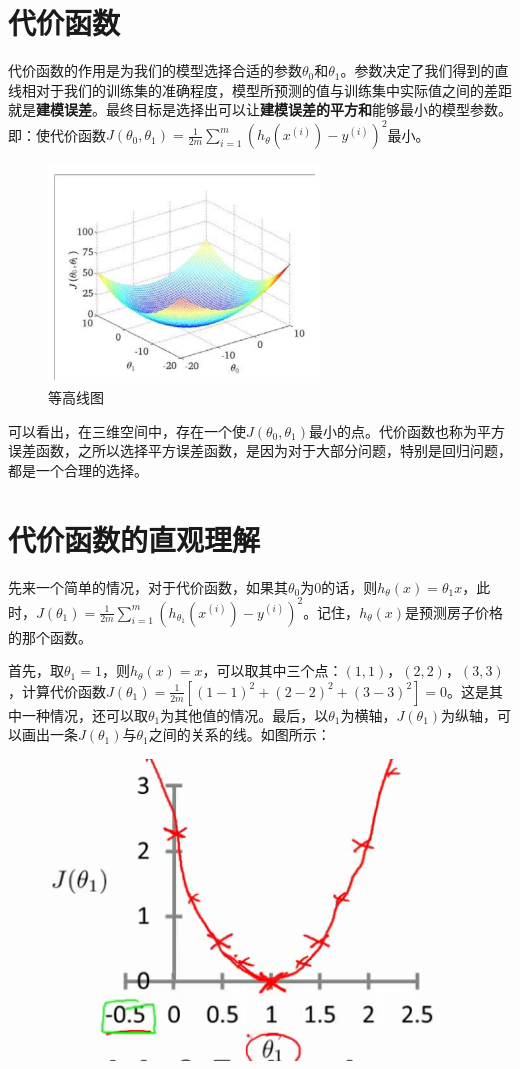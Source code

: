 \documentclass{article}
\begin{document}
\begin{large}
  \section{代价函数}
  代价函数的作用是为我们的模型选择合适的参数$\theta_0$和$\theta_1$。参数决定了我们得到的直线相对于我们的训练集的准确程度，模型所预测的值与训练集中实际值之间的差距就是\textbf{建模误差}。最终目标是选择出可以让\textbf{建模误差的平方和}能够最小的模型参数。即：使代价函数$J(\theta_0, \theta_1)=\frac{1}{2m}\sum_{i=1}^{m}(h_\theta(x^{(i)})-y^{(i)})^2$最小。

  \begin{figure}[h]
    \centering
    \includegraphics{1.PNG}
    \caption{等高线图}
  \end{figure}
  可以看出，在三维空间中，存在一个使$J(\theta_0, \theta_1)$最小的点。代价函数也称为平方误差函数，之所以选择平方误差函数，是因为对于大部分问题，特别是回归问题，都是一个合理的选择。

  \section{代价函数的直观理解}
  先来一个简单的情况，对于代价函数，如果其$\theta_0$为0的话，则$h_\theta(x)=\theta_1x$，此时，$J(\theta_1)=\frac{1}{2m}\sum_{i=1}^{m}(h_{\theta_1}(x^{(i)})-y^{(i)})^2$。记住，$h_\theta(x)$是预测房子价格的那个函数。

  首先，取$\theta_1=1$，则$h_\theta(x)=x$，可以取其中三个点：$(1,1)$，$(2,2)$，$(3,3)$，计算代价函数$J(\theta_1)=\frac{1}{2m}[(1-1)^2+(2-2)^2+(3-3)^2]=0$。这是其中一种情况，还可以取$\theta_1$为其他值的情况。最后，以$\theta_1$为横轴，$J(\theta_1)$为纵轴，可以画出一条$J(\theta_1)$与$\theta_1$之间的关系的线。如图所示：
  \begin{figure}[h]
    \centering
    \includegraphics[scale=0.7]{2.PNG}
  \end{figure}


\end{large}
\end{document}
